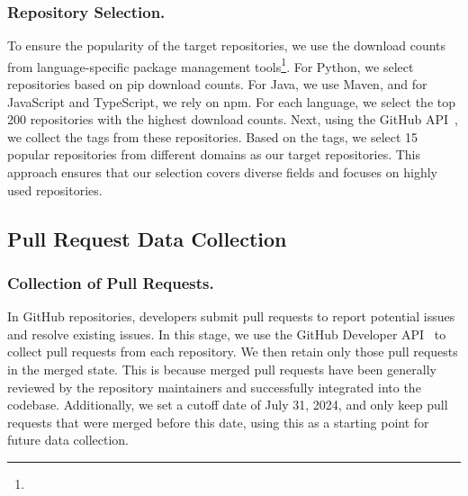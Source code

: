 \subsubsection{Repository Selection.} 

To ensure the popularity of the target repositories, we use the download counts from language-specific package management tools\footnote{}. For Python, we select repositories based on pip download counts. For Java, we use Maven, and for JavaScript and TypeScript, we rely on npm. For each language, we select the top 200 repositories with the highest download counts. Next, using the GitHub API~\cite{github-rest-api}, we collect the tags from these repositories. Based on the tags, we select 15 popular repositories from different domains as our target repositories. This approach ensures that our selection covers diverse fields and focuses on highly used repositories.

\subsection{Pull Request Data Collection} 
\subsubsection{Collection of Pull Requests.} In GitHub repositories, developers submit pull requests to report potential issues and resolve existing issues. In this stage, we use the GitHub Developer API~\cite{github-rest-api} to collect pull requests from each repository. We then retain only those pull requests in the merged state. This is because merged pull requests have been generally reviewed by the repository maintainers and successfully integrated into the codebase. Additionally, we set a cutoff date of July 31, 2024, and only keep pull requests that were merged before this date, using this as a starting point for future data collection.




